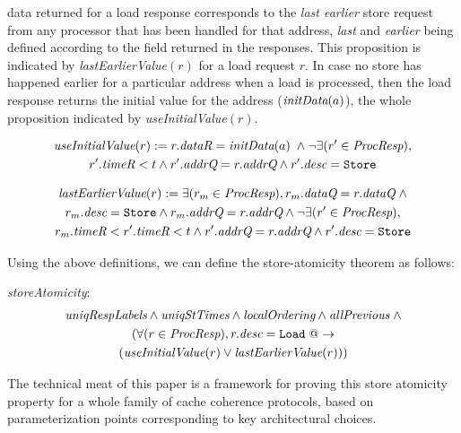 data returned for a load response corresponds to the \emph{last earlier} store
request from any processor that has been handled for that address, \emph{last}
and \emph{earlier} being defined according to the field \timeR{} returned in
the responses.  This proposition is indicated by \textit{lastEarlierValue}$(r)$
for a load request $r$.  In case no store has happened earlier for a particular
address when a load is processed, then the load response returns the initial
value for the address ($\textit{initData}(a)$), the whole proposition indicated by
\textit{useInitialValue}$(r)$.
\begin{defn}
\small
\begin{multline*}
\textit{useInitialValue}(r) := r.\textit{dataR} = \textit{initData}(a) \; \wedge \neg \exists (r' \in \textit{ProcResp}), \\
r'.\textit{timeR} < t \wedge r'.\textit{addrQ} = r.\textit{addrQ} \wedge r'.\textit{desc} = \texttt{Store}
\end{multline*}
\label{useInitialValue}
\end{defn}
%
\begin{defn}
\small
\begin{multline*}
\textit{lastEarlierValue}(r) := \exists (r_m \in \textit{ProcResp}), r_m.\textit{dataQ} = r.\textit{dataQ} \; \wedge 
\\ r_m.\textit{desc} = \texttt{Store} \wedge r_m.\textit{addrQ} = r.\textit{addrQ} \wedge
\neg \exists (r' \in \textit{ProcResp}), \\
r_m.\textit{timeR} < r'.\textit{timeR} < t \wedge r'.\textit{addrQ} = r.\textit{addrQ} \wedge r'.\textit{desc} = \texttt{Store}
\end{multline*}
\label{lastEarlierValue}
\end{defn}
%
Using the above definitions, we can define the store-atomicity theorem as follows:
\begin{thm}\textit{storeAtomicity}:
\small
\begin{multline*}
\textit{uniqRespLabels} \wedge
\textit{uniqStTimes} \wedge \textit{localOrdering} \wedge \textit{allPrevious} \; \wedge \\
(\forall (r \in \textit{ProcResp}), r.\textit{desc} = \texttt{Load} \; @-> \\
(\textit{useInitialValue}(r) \vee \textit{lastEarlierValue}(r)))
\end{multline*}
\label{storeAtomicity}
\end{thm}

The technical meat of this paper is a framework for proving this store atomicity
property for a whole family of cache coherence protocols, based on parameterization
points corresponding to key architectural choices.
